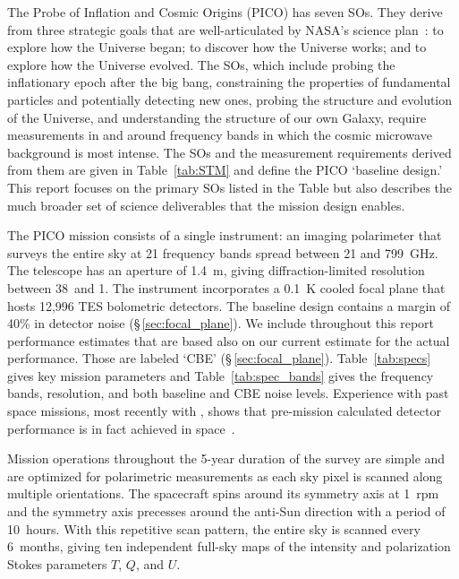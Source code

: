 \documentclass[PICOReport.tex]{subfiles}
\begin{document}
 
 
The Probe of Inflation and Cosmic Origins (PICO) has seven \ac{SOs}. They derive from three strategic goals that are well-articulated by NASA's science plan~\citep{latest_nasa_science_plan,latest_nasa_strategic_plan}: to explore how the Universe began; to discover how the Universe works; and to explore how the Universe evolved. The \ac{SOs}, which include probing the inflationary epoch after the big bang, constraining the properties of fundamental particles and potentially detecting new ones, probing the structure and evolution of the Universe, and understanding the structure of our own Galaxy, require measurements in and around frequency bands in which the cosmic microwave background is most intense. The \ac{SOs} and the measurement requirements derived from them are given in Table~\ref{tab:STM} and define the PICO `baseline design.' 
This report focuses on the primary \ac{SOs} listed in the Table but also describes the much broader set of science deliverables that the mission design enables.

The PICO mission consists of a single instrument: an imaging polarimeter that surveys the entire sky at 21 frequency bands spread between 21 and 799~GHz.  The telescope has an aperture of 1.4~m, giving diffraction-limited resolution between 38\arcmin\ and 1\arcmin . The instrument incorporates a 0.1~K cooled focal plane that hosts 12,996 \ac{TES} bolometric detectors. The baseline design contains a margin of 40\% in detector noise (\S\,\ref{sec:focal_plane}). We include throughout this report performance estimates that are based also on our current estimate for the actual performance. Those are labeled `\ac{CBE}' (\S\,\ref{sec:focal_plane}). Table~\ref{tab:specs} gives key mission parameters and Table~\ref{tab:spec_bands} gives the frequency bands, resolution, and both baseline and \ac{CBE} noise levels. Experience with past space missions, most recently with \planck , shows that pre-mission calculated detector performance is in fact achieved in space~\citep{planck1101.2038,planck1101.2039,Jarosik}.

Mission operations throughout the 5-year duration of the survey are simple and are optimized for polarimetric measurements as each sky pixel is scanned along multiple orientations. The spacecraft spins around its symmetry axis at 1~rpm and the symmetry axis precesses around the anti-Sun direction with a period of 10~hours. With this repetitive scan pattern, the entire sky is scanned every 6~months, giving ten independent full-sky maps of the intensity and polarization Stokes parameters $T$, $Q$, and $U$.  
\end{document}
